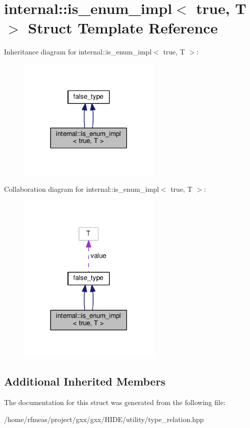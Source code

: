 \hypertarget{structinternal_1_1is__enum__impl_3_01true_00_01T_01_4}{}\section{internal\+:\+:is\+\_\+enum\+\_\+impl$<$ true, T $>$ Struct Template Reference}
\label{structinternal_1_1is__enum__impl_3_01true_00_01T_01_4}


Inheritance diagram for internal\+:\+:is\+\_\+enum\+\_\+impl$<$ true, T $>$\+:
\nopagebreak
\begin{figure}[H]
\begin{center}
\leavevmode
\includegraphics[width=194pt]{structinternal_1_1is__enum__impl_3_01true_00_01T_01_4__inherit__graph}
\end{center}
\end{figure}


Collaboration diagram for internal\+:\+:is\+\_\+enum\+\_\+impl$<$ true, T $>$\+:
\nopagebreak
\begin{figure}[H]
\begin{center}
\leavevmode
\includegraphics[width=194pt]{structinternal_1_1is__enum__impl_3_01true_00_01T_01_4__coll__graph}
\end{center}
\end{figure}
\subsection*{Additional Inherited Members}


The documentation for this struct was generated from the following file\+:\begin{DoxyCompactItemize}
\item 
/home/rfmeas/project/gxx/gxx/\+H\+I\+D\+E/utility/type\+\_\+relation.\+hpp\end{DoxyCompactItemize}
